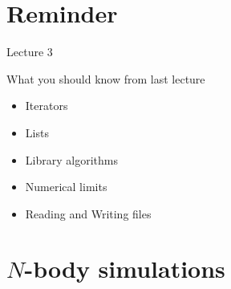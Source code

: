 \documentclass[\classoption]{beamer}
\title{\coursename}
\subtitle{Lecture 4: N-Body simulations, Structs, Classes, and generic functions}
\author{\tiny Patrick Diehl \orcid{0000-0003-3922-8419}}
\date {
 \tiny \url{\courseurl}
\vspace{2cm}
\doclicenseThis  
  
}
\begin{document}
 {
    \frame {
        \titlepage
    }
}

\frame{

\tableofcontents

}


\section{Reminder}

\begin{frame}{Lecture 3}
\begin{block}{What you should know from last lecture}
\begin{itemize}
\item Iterators
\item Lists
\item Library algorithms
\item Numerical limits
\item Reading and Writing files
\end{itemize}
\end{block}
\end{frame}


\section{$N$-body simulations}
\end{document}
